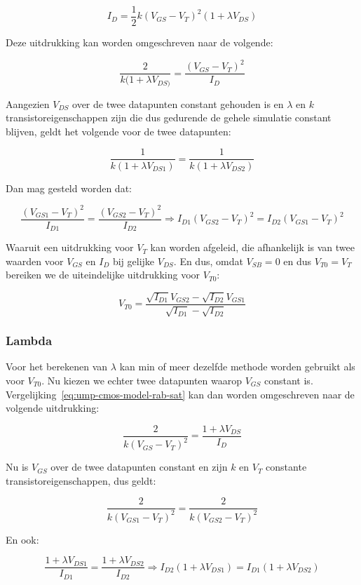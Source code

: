 \documentclass{scrartcl}
\begin{document}
\begin{equation} \label{eq:ump-cmos-model-rab-sat}
	I_{D} = \frac{1}{2} k (V_{GS} - V_{T})^2(1 + \lambda V_{DS})
\end{equation}

Deze uitdrukking kan worden omgeschreven naar de volgende:

$$\frac{2}{k(1 + \lambda V_{DS)}} = \frac{(V_{GS} - V_{T})^2}{I_{D}}$$

Aangezien $V_{DS}$ over de twee datapunten constant gehouden is en $\lambda$ en $k$ transistoreigenschappen zijn die dus gedurende de gehele simulatie constant blijven, geldt het volgende voor de twee datapunten:

$$\frac{1}{k(1 + \lambda V_{DS1})} = \frac{1}{k(1 + \lambda V_{DS2})}$$

Dan mag gesteld worden dat:

$$\frac{(V_{GS1} - V_{T})^2}{I_{D1}} = \frac{(V_{GS2} - V_{T})^2}{I_{D2}} \Rightarrow I_{D1}(V_{GS2} - V_{T})^2 = I_{D2}(V_{GS1} - V_{T})^2$$

Waaruit een uitdrukking voor $V_{T}$ kan worden afgeleid, die afhankelijk is van twee waarden voor $V_{GS}$ en $I_{D}$ bij gelijke $V_{DS}$. En dus, omdat $V_{SB} = 0$ en dus $V_{T0} = V_{T}$ bereiken we de uiteindelijke uitdrukking voor $V_{T0}$:

\begin{equation} \label{eq:ump-vt0}
	V_{T0} = \frac{\sqrt{I_{D1}}V_{GS2} - \sqrt{I_{D2}}V_{GS1}}{\sqrt{I_{D1}} - \sqrt{I_{D2}}}
\end{equation}

\subsubsection{Lambda}
\label{subsubsec:ump-methode-verw-lambda}
Voor het berekenen van $\lambda$ kan min of meer dezelfde methode worden gebruikt als voor $V_{T0}$. Nu kiezen we echter twee datapunten waarop $V_{GS}$ constant is. Vergelijking~\ref{eq:ump-cmos-model-rab-sat} kan dan worden omgeschreven naar de volgende uitdrukking:

$$\frac{2}{k(V_{GS}-V_{T})^2} = \frac{1 + \lambda V_{DS}}{I_{D}}$$

Nu is $V_{GS}$ over de twee datapunten constant en zijn $k$ en $V_{T}$ constante transistoreigenschappen, dus geldt:

$$\frac{2}{k(V_{GS1}-V_{T})^2} = \frac{2}{k(V_{GS2}-V_{T})^2}$$

En ook:

$$\frac{1 + \lambda V_{DS1}}{I_{D1}} = \frac{1 + \lambda V_{DS2}}{I_{D2}} \Rightarrow I_{D2}(1 + \lambda V_{DS1}) = I_{D1}(1 + \lambda V_{DS2})$$
\end{document}
